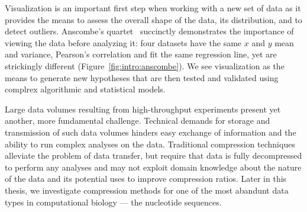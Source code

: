 \documentclass[12pt]{cmuthesis}
\begin{document}

Visualization is an important first step when working with a new set of data as it provides the means to assess the overall shape of the data, its distribution, and to detect outliers. Anscombe's quartet~\cite{anscombe} succinctly demonstrates the importance of viewing the data before analyzing it: four datasets have the same $x$ and $y$ mean and variance, Pearson's correlation and fit the same regression line, yet are strickingly different (Figure~\ref{fig:intro:anscombe}). We see visualization as the means to generate new hypotheses that are then tested and validated using complrex algorithmic and statistical models.



Large data volumes resulting from high-throughput experiments present yet another, more fundamental challenge. Technical demands for storage and transmission of such data volumes hinders easy exchange of information and the ability to run complex analyses on the data. Traditional compression techniques alleviate the problem of data transfer, but require that data is fully decompressed to perform any analyses and may not exploit domain knowledge about the nature of the data and its potential uses to improve compression ratios. Later in this thesis, we investigate compression methods for one of the most abandunt data types in computational biology --- the nucleotide sequences.




\end{document}
